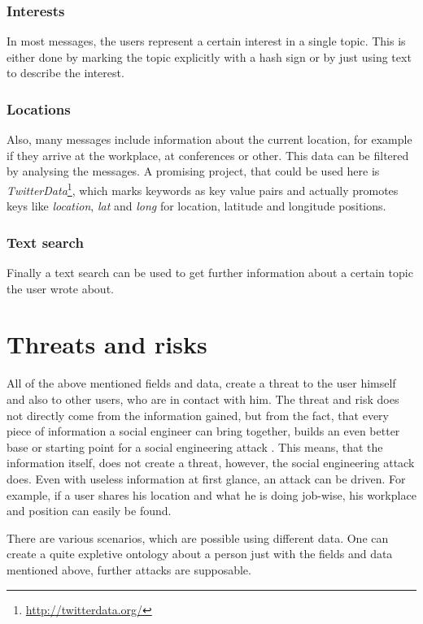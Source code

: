 \subsubsection{Interests}

In most messages, the users represent a certain interest in a single topic.
This is either done by marking the topic explicitly with a hash sign or by just
using text to describe the interest. 

\subsubsection{Locations}

Also, many messages include information about the current location, for example
if they arrive at the workplace, at conferences or other. This data can be
filtered by analysing the messages. A promising project, that could be used
here is \textit{TwitterData}\footnote{\url{http://twitterdata.org/}}, which
marks keywords as key value pairs and actually promotes keys like
\textit{location}, \textit{lat} and \textit{long} for location, latitude and longitude
positions.

\subsubsection{Text search}

Finally a text search can be used to get further information about a certain
topic the user wrote about. 

\section{Threats and risks}

All of the above mentioned fields and data, create a threat to the user himself
and also to other users, who are in contact with him. The threat and risk does
not directly come from the information gained, but from the fact, that every
piece of information a social engineer can bring together, builds an even
better base or starting point for a social engineering attack
\cite{mitnick2003}. This means, that the information itself, does not create a
threat, however, the social engineering attack does. Even with useless
information at first glance, an attack can be driven. For example, if a user
shares his location and what he is doing job-wise, his workplace and position
can easily be found.

There are various scenarios, which are possible using different data. One can
create a quite expletive ontology about a person just with the fields and data
mentioned above, further attacks are supposable.

